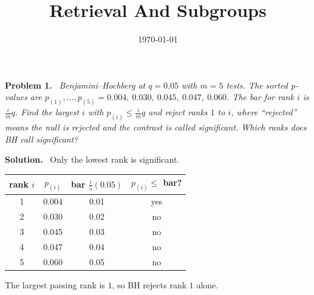 \documentclass[11pt]{article}
\title{Retrieval And Subgroups}
\author{}
\date{\today}
\newenvironment{problem}[1]
  {\par\medskip\noindent\textbf{Problem #1.}\ \itshape}
  {\par\medskip}
\newenvironment{solution}
  {\par\noindent\textbf{Solution.}\ }
  {\par\medskip}
\begin{document}
\maketitle


\begin{problem}{1}
Benjamini--Hochberg at $q = 0.05$ with $m = 5$ tests. The sorted p-values are
$p_{(1)},\dots,p_{(5)} = 0.004,\ 0.030,\ 0.045,\ 0.047,\ 0.060$.
The bar for rank $i$ is $\frac{i}{m}q$. Find the largest $i$ with
$p_{(i)} \le \frac{i}{m}q$ and reject ranks $1$ to $i$, where ``rejected''
means the null is rejected and the contrast is called significant.
Which ranks does BH call significant?
\end{problem}
\begin{solution}
Only the lowest rank is significant.

\begin{center}
\begin{tabular}{cccc}
rank $i$ & $p_{(i)}$ & bar $\frac{i}{5}(0.05)$ & $p_{(i)} \le$ bar? \\ \hline
1 & 0.004 & 0.01 & yes \\
2 & 0.030 & 0.02 & no \\
3 & 0.045 & 0.03 & no \\
4 & 0.047 & 0.04 & no \\
5 & 0.060 & 0.05 & no
\end{tabular}
\end{center}

The largest passing rank is $1$, so BH rejects rank $1$ alone.
\end{solution}
\end{document}
